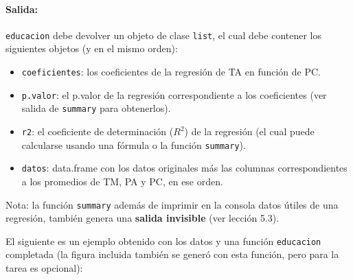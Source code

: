 \documentclass[]{article}
\begin{document}
\paragraph{Salida:}

\texttt{educacion} debe devolver un objeto de clase \texttt{list}, el
cual debe contener los siguientes objetos (y en el mismo orden):

\begin{itemize}
\item
  \texttt{coeficientes}: los coeficientes de la regresión de TA en
  función de PC.
\item
  \texttt{p.valor}: el p.valor de la regresión correspondiente a los
  coeficientes (ver salida de \texttt{summary} para obtenerlos).
\item
  \texttt{r2}: el coeficiente de determinación ($R^2$) de la regresión
  (el cual puede calcularse usando una fórmula o la función
  \texttt{summary}).
\item
  \texttt{datos}: data.frame con los datos originales más las columnas
  correspondientes a los promedios de TM, PA y PC, en ese orden.
\end{itemize}
Nota: la función \texttt{summary} además de imprimir en la consola datos
útiles de una regresión, también genera una \textbf{salida invisible}
(ver lección 5.3).

El siguiente es un ejemplo obtenido con los datos y una función
\texttt{educacion} completada (la figura incluida también se generó con
esta función, pero para la tarea es opcional):
\end{document}
